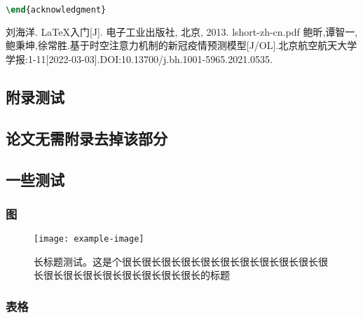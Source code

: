 \documentclass{imutthesis}
\begin{document}
{\begin{lstlisting}[language=TeX]
\end{acknowledgment}

\end{lstlisting} 



\begin{conclusion}
\zhlipsum[1-2]	

\end{conclusion}

\begin{notation}
\lipsum[1-2]

\end{notation}

\begin{thebibliography}{99}
刘海洋. \LaTeX 入门[J]. 电子工业出版社, 北京, 2013.
lshort-zh-cn.pdf
鲍昕,谭智一,鲍秉坤,徐常胜.基于时空注意力机制的新冠疫情预测模型[J/OL].北京航空航天大学学报:1-11[2022-03-03].DOI:10.13700/j.bh.1001-5965.2021.0535.
\end{thebibliography}



\begin{appendices}	
\chapter{附录测试}
\section{论文无需附录去掉该部分}
\section{一些测试}
\subsection{图}
\begin{figure}[H]
	\centering
	\texttt{[image: example-image]}
	\caption{长标题测试。这是个很长很长很长很长很长很长很长很长很长很长很长很长很长很长很长很长很长很长很长的标题}
\end{figure}
\subsection{表格}
\begin{table}[H]
	\centering
	\caption{三线表}
\end{table}

\end{appendices}}
\end{document}

